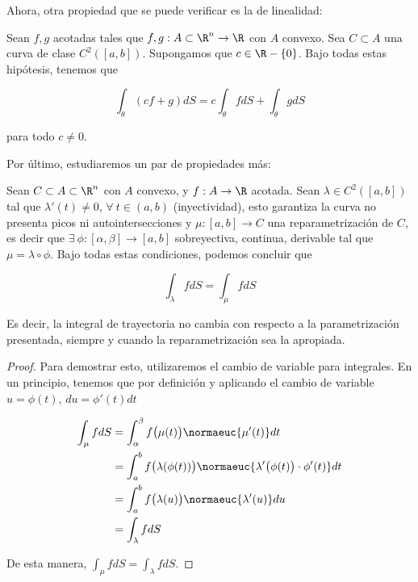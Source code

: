 Ahora, otra propiedad que se puede verificar es la de linealidad:

\begin{teo}
    Sean $f,g$ acotadas tales que $f,g: A \subset \R^n \rightarrow \R$ con $A$ convexo. Sea $C \subset A$ una curva de clase $C^2([a,b])$. Supongamos que $c \in \R - \{0\}$. Bajo todas estas hipótesis, tenemos que

    \[
    \int_{\theta} \left( cf + g \right)dS = c\int_{\theta} fdS + \int_{\theta} gdS
    \]
    
    \noindent para todo $c \neq 0$.
\end{teo}

Por último, estudiaremos un par de propiedades más:

\begin{teo}
    Sean $C \subset A \subset \R^n$ con $A$ convexo, y $f: A \rightarrow \R$ acotada. Sean $\lambda \in C^2([a,b])$ tal que $\lambda'(t) \neq 0$, $\forall~t \in (a,b)$ (inyectividad), esto garantiza la curva no presenta picos ni autointersecciones y $\mu: [a,b] \rightarrow C$ una reparametrización de $C$, es decir que $\exists~\phi:[\alpha,\beta] \rightarrow [a,b]$ sobreyectiva, continua, derivable tal que $\mu = \lambda \circ \phi$. Bajo todas estas condiciones, podemos concluir que

    \[
    \int_{\lambda} fdS = \int_{\mu} fdS
    \]
    
    Es decir, la integral de trayectoria no cambia con respecto a la parametrización presentada, siempre y cuando la reparametrización sea la apropiada. 
\end{teo}

\begin{proof}
    Para demostrar esto, utilizaremos el cambio de variable para integrales. En un principio, tenemos que por definición y aplicando el cambio de variable $u = \phi(t)$, $du = \phi'(t)dt$
    
    \begin{align*}
        \int_{\mu} fdS &= \int_{\alpha}^{\beta} f\big( \mu(t) \big)\normaeuc{\mu'(t)}dt \\
            &= \int_a^b f\big( \lambda(\phi(t)) \big)\normaeuc{\lambda'\big( \phi(t) \big) \cdot \phi'(t)}dt \\
            &= \int_a^b f\big( \lambda(u) \big)\normaeuc{\lambda'(u)}du \\
            &= \int_{\lambda} fdS
    \end{align*}
    
    De esta manera, $\int_{\mu} fdS = \int_{\lambda} fdS$.
\end{proof}

